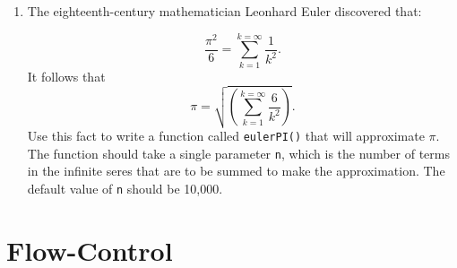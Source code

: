 \documentclass[]{book}
\makeatletter
\newenvironment{Shaded}{\begin{snugshade}}{\end{snugshade}}
\newcommand{\KeywordTok}[1]{\textcolor[rgb]{0.13,0.29,0.53}{\textbf{{#1}}}}
\newcommand{\DataTypeTok}[1]{\textcolor[rgb]{0.13,0.29,0.53}{{#1}}}
\newcommand{\DecValTok}[1]{\textcolor[rgb]{0.00,0.00,0.81}{{#1}}}
\newcommand{\StringTok}[1]{\textcolor[rgb]{0.31,0.60,0.02}{{#1}}}
\newcommand{\NormalTok}[1]{{#1}}
\newenvironment{kframe}{%
\medskip{}
\setlength{\fboxsep}{.8em}
 \def\at@end@of@kframe{}%
 \ifinner\ifhmode%
  \def\at@end@of@kframe{\end{minipage}}%
  \begin{minipage}{\columnwidth}%
 \fi\fi%
 \def\FrameCommand##1{\hskip\@totalleftmargin \hskip-\fboxsep
 \colorbox{shadecolor}{##1}\hskip-\fboxsep
     \hskip-\linewidth \hskip-\@totalleftmargin \hskip\columnwidth}%
 \MakeFramed {\advance\hsize-\width
   \@totalleftmargin\z@ \linewidth\hsize
   \@setminipage}}%
 {\par\unskip\endMakeFramed%
 \at@end@of@kframe}
\renewenvironment{Shaded}{\begin{kframe}}{\end{kframe}}
\theoremstyle{definition}
\theoremstyle{definition}
\theoremstyle{remark}
\makeatother
\begin{document}
{\begin{enumerate}
  Write a function called \texttt{isPalindrome()} that, when given any
  vector, will return \texttt{TRUE} if the vector is a palindrome and
  \texttt{FALSE} if it is not a palindrome. The function should take a
  single parameter called \texttt{vec}, with no default value. Typical
  examples of use should be:

\begin{Shaded}
\begin{Highlighting}[]
\KeywordTok{palindrome}\NormalTok{(}\DataTypeTok{vec =} \KeywordTok{c}\NormalTok{(}\StringTok{"Bob"}\NormalTok{, }\StringTok{"Marley"}\NormalTok{, }\StringTok{"Bob"}\NormalTok{))}
\end{Highlighting}
\end{Shaded}

\begin{verbatim}
## [1] TRUE
\end{verbatim}

\begin{Shaded}
\begin{Highlighting}[]
\KeywordTok{palindrome}\NormalTok{(}\KeywordTok{c}\NormalTok{(}\DecValTok{3}\NormalTok{,}\DecValTok{2}\NormalTok{,}\DecValTok{7}\NormalTok{,}\DecValTok{4}\NormalTok{,}\DecValTok{3}\NormalTok{))}
\end{Highlighting}
\end{Shaded}

\begin{verbatim}
## [1] FALSE
\end{verbatim}

  \textbf{Hint:} You already have the function \texttt{reverse()} from
  the previous Exercise. Use this function, along with the Boolean
  operator \texttt{==} and the \texttt{all()} function.
\item
  The eighteenth-century mathematician Leonhard Euler discovered that:

  \[\frac{\pi^2}{6} = \sum_{k=1}^{k=\infty} \frac{1}{k^2}.\] It follows
  that
  \[\pi = \sqrt{\left(\sum_{k=1}^{k=\infty} \frac{6}{k^2}\right)}.\] Use
  this fact to write a function called \texttt{eulerPI()} that will
  approximate \(\pi\). The function should take a single parameter
  \texttt{n}, which is the number of terms in the infinite seres that
  are to be summed to make the approximation. The default value of
  \texttt{n} should be 10,000.
\end{enumerate}

\chapter{Flow-Control}\label{flow}

}
\end{document}
